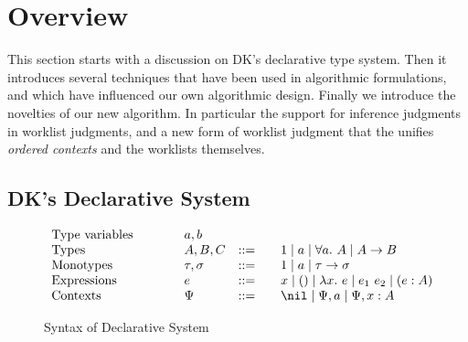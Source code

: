\section{Overview}

This section starts with a discussion on DK's declarative type system.
Then it introduces several techniques that have been used in algorithmic
formulations, and which have influenced our own algorithmic design.
Finally we introduce the novelties of our new algorithm.
In particular the support for inference judgments in
worklist judgments, and a new form of worklist judgment
that the unifies \emph{ordered contexts} and the worklists themselves. 


\subsection{DK's Declarative System}

\begin{figure}[t]
	\[
	\begin{array}{l@{\qquad}lcl}
	\text{Type variables}\qquad&a, b
	\\
	\text{Types}\qquad&A, B, C &::=&\quad 1 \mid a \mid \all A \mid A\to B\\
	\text{Monotypes}\qquad&\tau,\sigma &::=&\quad 1 \mid a \mid \tau\to \sigma
	\\
	\text{Expressions}\qquad&e &::=&\quad x \mid () \mid \lam e \mid e_1~e_2 \mid (e:A)
	\\
	\text{Contexts}\qquad&\Psi &::=&\quad \nil \mid \Psi, a \mid \Psi, x:A
	\end{array}
	\]
	\caption{Syntax of Declarative System}
\end{figure}

